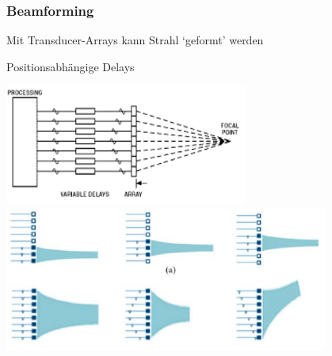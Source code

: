 \begin{minipage}{0.4\textwidth}
    \subsubsection{Beamforming}
    \begin{compactitem}
        \item Mit Transducer-Arrays kann Strahl ‘geformt’ werden
        \item Positionsabhängige Delays
    \end{compactitem}
    \includegraphics[width=0.6\textwidth]{images/Beamforming1}\\
    \includegraphics[width=0.8\textwidth]{images/Beamforming2}
\end{minipage}